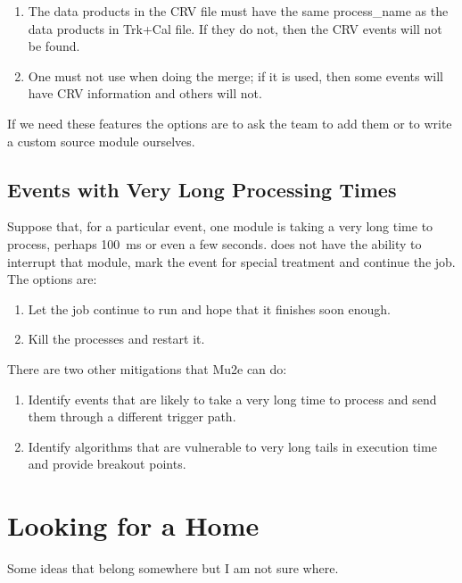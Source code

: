 \begin{enumerate}
\item The data products in the CRV file must have the same process\_name as the data products in Trk+Cal file.
  If they do not, then the CRV events will not be found.
\item One must not use  when doing the merge;
  if it is used, then some events will have CRV information and others will not.
\end{enumerate}

If we need these features the options are to ask the \art team to add them or to write a custom source
module ourselves.

\section{Events with Very Long Processing Times}

Suppose that, for a particular event, one module is taking a very long time to process,
perhaps 100~ms or even a few seconds.  \art does not have the ability to interrupt
that module, mark the event for special treatment and continue the job.  The options are:

\begin{enumerate}
  \item Let the job continue to run and hope that it finishes soon enough.
  \item Kill the processes and restart it.
\end{enumerate}

There are two other mitigations that Mu2e can do:
\begin{enumerate}
  \item Identify events that are likely to take a very long time to process and send them through a different trigger path.
  \item Identify algorithms that are vulnerable to very long tails in execution time and provide breakout points.
\end{enumerate}


\chapter{Looking for a Home}
\label{app:LookingForaHome}

Some ideas that belong somewhere but I am not sure where.



\clearpage
{}
{}
\printbibliography



